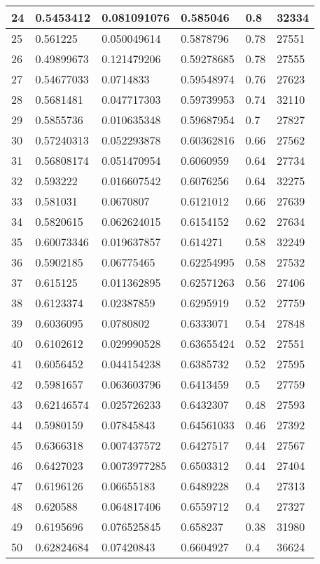 \begin{longtable}{|l|l|l|l|l|l|}
24 & 0.5453412 & 0.081091076 & 0.585046 & 0.8 & 32334 \\ \hline 
25 & 0.561225 & 0.050049614 & 0.5878796 & 0.78 & 27551 \\ \hline 
26 & 0.49899673 & 0.121479206 & 0.59278685 & 0.78 & 27555 \\ \hline 
27 & 0.54677033 & 0.0714833 & 0.59548974 & 0.76 & 27623 \\ \hline 
28 & 0.5681481 & 0.047717303 & 0.59739953 & 0.74 & 32110 \\ \hline 
29 & 0.5855736 & 0.010635348 & 0.59687954 & 0.7 & 27827 \\ \hline 
30 & 0.57240313 & 0.052293878 & 0.60362816 & 0.66 & 27562 \\ \hline 
31 & 0.56808174 & 0.051470954 & 0.6060959 & 0.64 & 27734 \\ \hline 
32 & 0.593222 & 0.016607542 & 0.6076256 & 0.64 & 32275 \\ \hline 
33 & 0.581031 & 0.0670807 & 0.6121012 & 0.66 & 27639 \\ \hline 
34 & 0.5820615 & 0.062624015 & 0.6154152 & 0.62 & 27634 \\ \hline 
35 & 0.60073346 & 0.019637857 & 0.614271 & 0.58 & 32249 \\ \hline 
36 & 0.5902185 & 0.06775465 & 0.62254995 & 0.58 & 27532 \\ \hline 
37 & 0.615125 & 0.011362895 & 0.62571263 & 0.56 & 27406 \\ \hline 
38 & 0.6123374 & 0.02387859 & 0.6295919 & 0.52 & 27759 \\ \hline 
39 & 0.6036095 & 0.0780802 & 0.6333071 & 0.54 & 27848 \\ \hline 
40 & 0.6102612 & 0.029990528 & 0.63655424 & 0.52 & 27551 \\ \hline 
41 & 0.6056452 & 0.044154238 & 0.6385732 & 0.52 & 27595 \\ \hline 
42 & 0.5981657 & 0.063603796 & 0.6413459 & 0.5 & 27759 \\ \hline 
43 & 0.62146574 & 0.025726233 & 0.6432307 & 0.48 & 27593 \\ \hline 
44 & 0.5980159 & 0.07845843 & 0.64561033 & 0.46 & 27392 \\ \hline 
45 & 0.6366318 & 0.007437572 & 0.6427517 & 0.44 & 27567 \\ \hline 
46 & 0.6427023 & 0.0073977285 & 0.6503312 & 0.44 & 27404 \\ \hline 
47 & 0.6196126 & 0.06655183 & 0.6489228 & 0.4 & 27313 \\ \hline 
48 & 0.620588 & 0.064817406 & 0.6559712 & 0.4 & 27327 \\ \hline 
49 & 0.6195696 & 0.076525845 & 0.658237 & 0.38 & 31980 \\ \hline 
50 & 0.62824684 & 0.07420843 & 0.6604927 & 0.4 & 36624 \\ \hline 
\end{longtable}